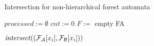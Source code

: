 \begin{algorithm}[ht]
  \caption{Intersection for non-hierarchical forest automata}
\label{alg:isect}

  {
    \Return{$()$}\;
  }

  $\mathit{processed} := \emptyset$\;
  $\mathit{cnt} := 0$\;
  $\mathit{F} :=$ empty FA\;
  
  {
    $\mathit{intersect}((\mathcal{F}_{\mathcal{A}}[x_i], \mathcal{F}_{\mathcal{B}}[x_i]))$\;
  }

  \;
\end{algorithm}

